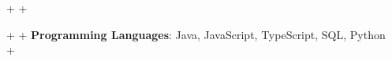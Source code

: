 \documentclass[letterpaper,10pt]{article}                                                                                                                                                                                                                                                                                                                                                                                                                                                                                                                                                                         +
\begin{document}
 \begin{itemize}[leftmargin=0.15in, label={}, itemsep=2pt]                                                                                                                                                                                                                                                                                                                                                                                                                                                                                                                                                         +
                                                                                                                                                                                                                                                                                                                                                                                                                                                                                                                                                                                                                   +
 \small{\item{                                                                                                                                                                                                                                                                                                                                                                                                                                                                                                                                                                                                     +
                                                                                                                                                                                                                                                                                                                                                                                                                                                                                                                                                                                                                   +
  \textbf{Programming Languages}{: Java, JavaScript, TypeScript, SQL, Python} \\                                                                                                                                                                                                                                                                                                                                                                                                                                                                                                                                   +
}}
\end{itemize}
\end{document}
